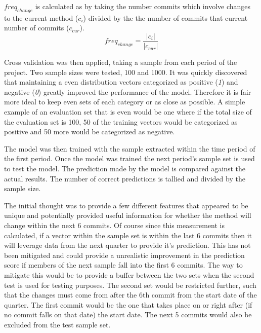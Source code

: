 $freq_{change}$ is calculated as by taking the number commits which involve changes to the current method ($c_i$) divided by the the number of commits that current number of commits ($c_{cur}$).
\begin{equation}
\label{eq:freq_change}
freq_{change} = \frac{|c_i|}{|c_{cur}|}
\end{equation}



Cross validation was then applied, taking a sample from each period of the project. Two sample sizes were tested, 100 and 1000. It was quickly discovered that maintaining a even distribution vectors categorized as positive (\textit{1}) and negative (\textit{0}) greatly improved the performance of the model. Therefore it is fair more ideal to keep even sets of each category or as close as possible. A simple example of an evaluation set that is even would be one where if the total size of the evaluation set is 100, 50 of the training vectors would be categorized as positive and 50 more would be categorized as negative.

The model was then trained with the sample extracted within the time period of the first period. Once the model was trained the next period's sample set is used to test the model. The prediction made by the model is compared against the actual results. The number of correct predictions is tallied and divided by the sample size. 


The initial thought was to provide a few different features that appeared to be unique and potentially provided useful information for whether the method will change within the next 6 commits. Of course since this measurement is calculated, if a vector within the sample set is within the last 6 commits then it will leverage data from the next quarter to provide it's prediction. This has not been mitigated and could provide a unrealistic improvement in the prediction score if members of the next sample fall into the first 6 commits. The way to mitigate this would be to provide a buffer between the two sets when the second test is used for testing purposes. The second set would be restricted further, such that the changes must come from after the 6th commit from the start date of the quarter. The first commit would be the one that takes place on or right after (if no commit falls on that date) the start date. The next 5 commits would also be excluded from the test sample set.

